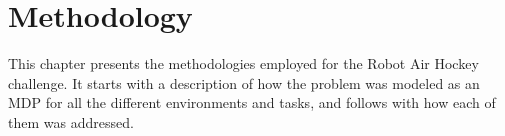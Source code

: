 \chapter{Methodology}
\label{ch:methodology}

This chapter presents the methodologies employed for the Robot Air Hockey challenge. It starts with a description of how
the problem was modeled as an MDP for all the different environments and tasks, and follows with how each of them was addressed.






